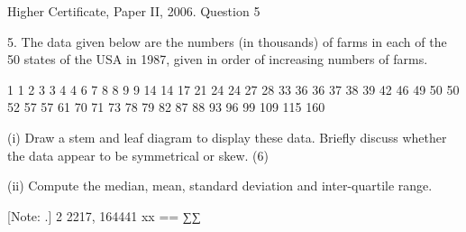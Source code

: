 \documentclass[a4paper,12pt]{article}
\begin{document}
Higher Certificate, Paper II, 2006.  Question 5 

\begin{framed}

 
5. The data given below are the numbers (in thousands) of farms in each of the 50 states of the USA in 1987, given in order of increasing numbers of farms. 
 
    1     1     2     3     3     4     4     6     7     8     8     9     9   14   14   17   21   24   24   27   28   33   36   36   37   38   39   42   46   49   50   50   52   57   57   61   70   71   73   78   79   82   87   88   93   96   99 109 115 160   
 
 
(i) Draw a stem and leaf diagram to display these data.  Briefly discuss whether the data appear to be symmetrical or skew. (6) 
 
(ii) Compute the median, mean, standard deviation and inter-quartile range. 
 
[Note:    .] 2 2217, 164441 xx == ∑∑
 

 

\end{framed}
\end{document}
